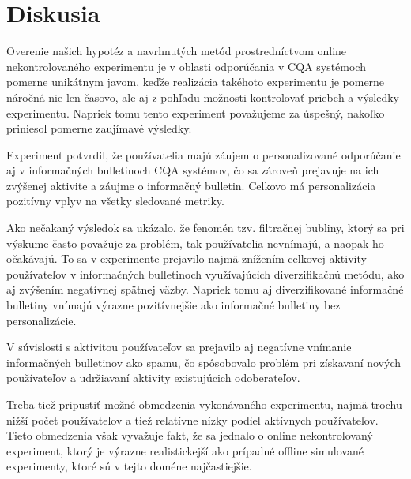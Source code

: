 \section{Diskusia}

Overenie našich hypotéz a navrhnutých metód prostredníctvom online nekontrolovaného experimentu je v oblasti odporúčania
v CQA systémoch pomerne unikátnym javom, keďže realizácia takéhoto experimentu je pomerne náročná nie len časovo,
ale aj z pohľadu možnosti kontrolovať priebeh a výsledky experimentu. Napriek tomu tento experiment považujeme za úspešný,
nakoľko priniesol pomerne zaujímavé výsledky.

Experiment potvrdil, že používatelia majú záujem o personalizované odporúčanie aj v informačných bulletinoch CQA systémov,
čo sa zároveň prejavuje na ich zvýšenej aktivite a záujme o informačný bulletin. Celkovo má personalizácia pozitívny vplyv
na všetky sledované metriky.

Ako nečakaný výsledok sa ukázalo, že fenomén tzv. filtračnej bubliny, ktorý sa pri výskume často považuje za problém, tak
používatelia nevnímajú, a naopak ho očakávajú. To sa v experimente prejavilo najmä znížením celkovej aktivity používateľov
v informačných bulletinoch využívajúcich diverzifikačnú metódu, ako aj zvýšením negatívnej spätnej väzby. Napriek tomu
aj diverzifikované informačné bulletiny vnímajú výrazne pozitívnejšie ako informačné bulletiny bez personalizácie.

V súvislosti s aktivitou používateľov sa prejavilo aj negatívne vnímanie informačných bulletinov ako spamu,
čo spôsobovalo problém pri získavaní nových používateľov a udržiavaní aktivity existujúcich odoberateľov.

Treba tiež pripustiť možné obmedzenia vykonávaného experimentu, najmä trochu nižší počet používateľov a tiež relatívne
nízky podiel aktívnych používateľov. Tieto obmedzenia však vyvažuje fakt, že sa jednalo o online nekontrolovaný experiment,
ktorý je výrazne realistickejší ako prípadné offline simulované experimenty, ktoré sú v tejto doméne najčastiejšie.
